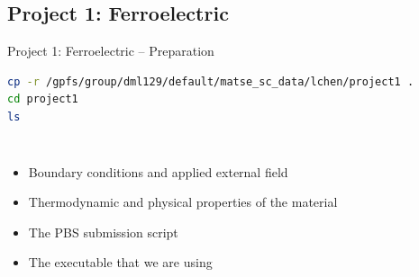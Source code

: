 \documentclass[11pt,aspectratio=169]{beamer}
\begin{document}
\subsection[Project 1: Ferroelectric]{Project 1: Ferroelectric}
\begin{frame}[fragile]{Project 1: Ferroelectric -- Preparation}
\small{
\begin{lstlisting}[language=bash]
cp -r /gpfs/group/dml129/default/matse_sc_data/lchen/project1 .
cd project1
ls
\end{lstlisting}
}
\begin{columns}
    \begin{itemize}
        \item [input.in] Boundary conditions and applied external field 
        \item [pot.in] Thermodynamic and physical properties of the material
        \item [ferro.pbs] The PBS submission script
        \item [Ferroelectric.exe] The executable that we are using
    \end{itemize}
\end{columns}
\end{frame}
\end{document}
